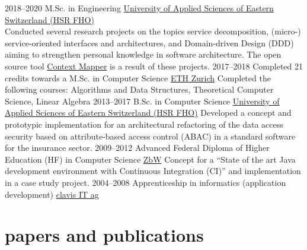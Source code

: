 \documentclass[]{cv-style}
\begin{document}
\begin{entrylist}
\entry
  {2018--2020}
  {M.Sc. {\normalfont in Engineering}}
  {\href{https://www.hsr.ch}{University of Applied Sciences of Eastern Switzerland (HSR FHO)}}
  {
  \\Conducted several research projects on the topics service decomposition, (micro-) service-oriented interfaces and architectures, and Domain-driven Design (DDD) aiming to strengthen personal knowledge in software architecture. The open source tool \href{https://contextmapper.org/}{Context Mapper} is a result of these projects.}
\entry
  {2017--2018}
  {Completed 21 credits towards a M.Sc. in Computer Science}
  {\href{https://www.ethz.ch}{ETH Zurich}}
  {Completed the following courses: Algorithms and Data Structures, Theoretical Computer Science, Linear Algebra}
\entry
  {2013--2017}
  {B.Sc. {\normalfont in Computer Science}}
  {\href{https://www.hsr.ch}{University of Applied Sciences of Eastern Switzerland (HSR FHO)}}
  {Developed a concept and prototypic implementation for an architectural refactoring of the data access security based on attribute-based access control (ABAC) in a standard software for the insurance sector.}
\entry
  {2009--2012}
  {Advanced Federal Diploma of Higher Education (HF) {\normalfont in Computer Science}}
  {\href{https://www.zbw.ch}{ZbW}}
  {Concept for a ``State of the art Java development environment with Continuous Integration (CI)'' and implementation in a case study project.}
\entry
  {2004--2008}
  {Apprenticeship {\normalfont in informatics (application development)}}
  {\href{https://www.clavisit.com}{clavis IT ag}}
  {}
\end{entrylist}


\section{papers and publications}
\end{document}
